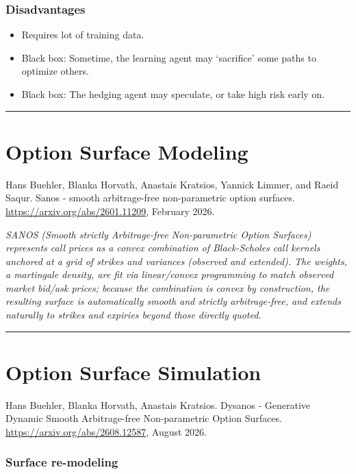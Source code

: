 \documentclass[11pt]{article}
\begin{document}
\subsubsection*{Disadvantages}

\begin{itemize}
    \item Requires lot of training data.
    \item Black box: Sometime, the learning agent may `sacrifice' some paths to optimize others.
    \item Black box: The hedging agent may speculate, or take high risk early on.
\end{itemize}

\vspace{1em}
\hrule
\section*{Option Surface Modeling}

Hans Buehler, Blanka Horvath, Anastais Kratsios, Yannick Limmer, and Raeid Saqur. Sanos - smooth arbitrage-free non-parametric option surfaces. \url{https://arxiv.org/abs/2601.11209}, February 2026.

\textit{SANOS (Smooth strictly Arbitrage-free Non-parametric Option Surfaces) represents call prices as a convex combination of Black-Scholes call kernels anchored at a grid of strikes and variances (observed and extended). The weights, a martingale density, are fit via linear/convex programming to match observed market bid/ask prices; because the combination is convex by construction, the resulting surface is automatically smooth and strictly arbitrage-free, and extends naturally to strikes and expiries beyond those directly quoted.}

\vspace{1em}
\hrule
\section*{Option Surface Simulation}

Hans Buehler, Blanka Horvath, Anastais Kratsios. Dysanos - Generative Dynamic Smooth Arbitrage-free Non-parametric Option Surfaces. \url{https://arxiv.org/abs/2608.12587}, August 2026.

\subsubsection*{Surface re-modeling}
\end{document}
